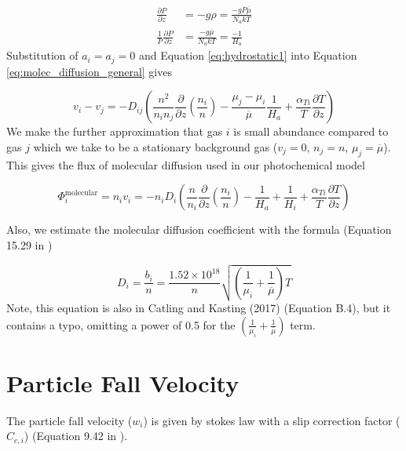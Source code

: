 \begin{align} 
  \frac{\partial P}{\partial z} &= -g \rho = \frac{-g P \overline{\mu}}{N_a k T} \\
  \frac{1}{P}\frac{\partial P}{\partial z} &= \frac{-g \overline{\mu}}{N_a k T} = \frac{-1}{H_a} \label{eq:hydrostatic1}
\end{align}
Substitution of $a_i = a_j = 0$ and Equation \eqref{eq:hydrostatic1} into Equation \eqref{eq:molec_diffusion_general} gives

\begin{equation} \label{eq:molec_diffusion_simplify1}
  v_i - v_j = -D_{ij} \left( \frac{n^2}{n_i n_j} \frac{\partial}{\partial z} \left(\frac{n_i}{n}\right) - \frac{\mu_j - \mu_i}{\overline{\mu}} \frac{1}{H_a} + \frac{\alpha_{Ti}}{T} \frac{\partial T}{\partial z} \right)
\end{equation}
We make the further approximation that gas $i$ is small abundance compared to gas $j$ which we take to be a stationary background gas ($v_j = 0$, $n_j = n$, $\mu_j = \overline{\mu}$). This gives the flux of molecular diffusion used in our photochemical model

\begin{equation} \label{eq:phi_molec_diffusion}
  \Phi_i^\text{molecular} = n_i v_i = -n_i D_{i} \left( \frac{n}{n_i} \frac{\partial}{\partial z} \left(\frac{n_i}{n}\right) - \frac{1}{H_a} + \frac{1}{H_i} + \frac{\alpha_{Ti}}{T} \frac{\partial T}{\partial z} \right)
\end{equation}

Also, we estimate the molecular diffusion coefficient with the formula (Equation 15.29 in \cite{Banks_2013})

\begin{equation} \label{eq:molec_diffusion_coeff}
  D_i = 
  \frac{b_i}{n} = \frac{1.52 \times 10^{18}}{n} \sqrt{\left( \frac{1}{\mu_i} + \frac{1}{\overline{\mu}} \right) T}
\end{equation}
Note, this equation is also in Catling and Kasting (2017) \cite{Catling_2017} (Equation B.4), but it contains a typo, omitting a power of 0.5 for the $\left( \frac{1}{\mu_i} + \frac{1}{\overline{\mu}} \right)$ term.

\section{Particle Fall Velocity} \label{sec:fall_velocity}

The particle fall velocity ($w_i$) is given by stokes law with a slip correction factor ($C_{c,i}$) (Equation 9.42 in \cite{Seinfeld_2006}).


